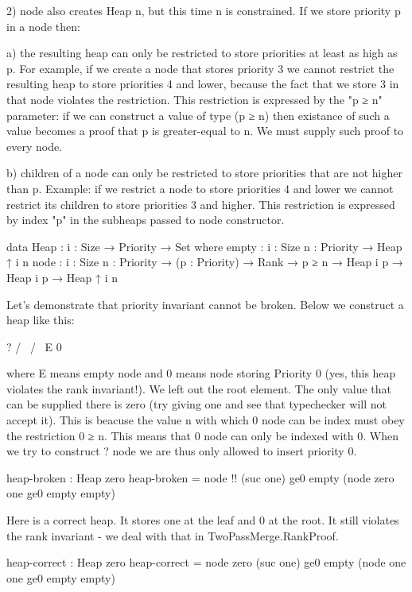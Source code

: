  2) node also creates Heap n, but this time n is constrained. If we
    store priority p in a node then:

      a) the resulting heap can only be restricted to store
         priorities at least as high as p. For example, if we
         create a node that stores priority 3 we cannot restrict
         the resulting heap to store priorities 4 and lower,
         because the fact that we store 3 in that node violates the
         restriction. This restriction is expressed by the "p ≥ n"
         parameter: if we can construct a value of type (p ≥ n)
         then existance of such a value becomes a proof that p is
         greater-equal to n. We must supply such proof to every
         node.

      b) children of a node can only be restricted to store
         priorities that are not higher than p. Example: if we
         restrict a node to store priorities 4 and lower we cannot
         restrict its children to store priorities 3 and
         higher. This restriction is expressed by index "p" in the
         subheaps passed to node constructor.

\begin{code}
data Heap : {i : Size} → Priority → Set where
  empty : {i : Size} {n : Priority} → Heap {↑ i} n
  node  : {i : Size} {n : Priority} → (p : Priority) → Rank → p ≥ n →
          Heap {i} p → Heap {i} p → Heap {↑ i} n
\end{code}

Let's demonstrate that priority invariant cannot be broken. Below
we construct a heap like this:
\begin{code}
     ?
    / \
   /   \
  E     0
\end{code}

where E means empty node and 0 means node storing Priority 0 (yes,
this heap violates the rank invariant!). We left out the root
element. The only value that can be supplied there is zero (try
giving one and see that typechecker will not accept it). This is
beacuse the value n with which 0 node can be index must obey the
restriction 0 ≥ n. This means that 0 node can only be indexed with
0. When we try to construct ? node we are thus only allowed to
insert priority 0.

\begin{code}
heap-broken : Heap zero
heap-broken = node {!!} (suc one) ge0 empty (node zero one ge0 empty empty)
\end{code}


Here is a correct heap. It stores one at the leaf and 0 at the
root. It still violates the rank invariant - we deal with that in
TwoPassMerge.RankProof.
\begin{code}
heap-correct : Heap zero
heap-correct = node zero (suc one) ge0 empty (node one one ge0 empty empty)
\end{code}



